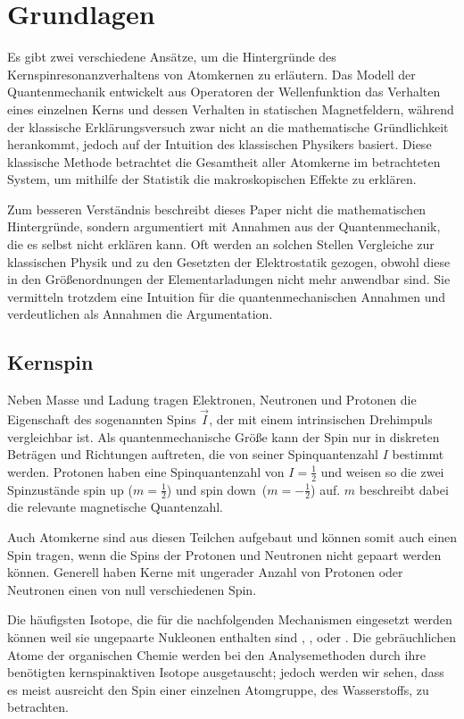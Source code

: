 \section{Grundlagen}
\label{bsc}
Es gibt zwei verschiedene Ansätze, um die Hintergründe des Kernspinresonanzverhaltens von Atomkernen zu erläutern. Das Modell der Quantenmechanik entwickelt aus Operatoren der Wellenfunktion das Verhalten eines einzelnen Kerns und dessen Verhalten in statischen Magnetfeldern, während der klassische Erklärungsversuch zwar nicht an die mathematische Gründlichkeit herankommt, jedoch auf der Intuition des klassischen Physikers basiert. Diese klassische Methode betrachtet die Gesamtheit aller Atomkerne im betrachteten System, um mithilfe der Statistik die makroskopischen Effekte zu erklären.

Zum besseren Verständnis beschreibt dieses Paper nicht die mathematischen Hintergründe, sondern argumentiert mit Annahmen aus der Quantenmechanik, die es selbst nicht erklären kann. Oft werden an solchen Stellen Vergleiche zur klassischen Physik und zu den Gesetzten der Elektrostatik gezogen, obwohl diese in den Grö\ss{}enordnungen der Elementarladungen nicht mehr anwendbar sind. Sie vermitteln trotzdem eine Intuition für die quantenmechanischen Annahmen und verdeutlichen als Annahmen die Argumentation.

\subsection{Kernspin}
\label{bsc:spin}
Neben Masse und Ladung tragen Elektronen, Neutronen und Protonen die Eigenschaft des sogenannten Spins $\vec{I}$, der mit einem intrinsischen Drehimpuls vergleichbar ist. Als quantenmechanische Grö\ss{}e kann der Spin nur in diskreten Beträgen und Richtungen auftreten, die von seiner Spinquantenzahl $I$ bestimmt werden. Protonen haben eine Spinquantenzahl von $ I = \frac{1}{2} $ und weisen so die zwei Spinzustände \glqq{}spin up\grqq{} ($ m=\frac{1}{2} $) und \glqq{}spin down\grqq\ ($m=-\frac{1}{2}$) auf. $m$ beschreibt dabei die relevante magnetische Quantenzahl.~\cite[S. 2]{schlemm08}

Auch Atomkerne sind aus diesen Teilchen aufgebaut und können somit auch einen Spin tragen, wenn die Spins der Protonen und Neutronen nicht gepaart werden können. Generell haben Kerne mit ungerader Anzahl von Protonen oder Neutronen einen von null verschiedenen Spin.

Die häufigsten Isotope, die für die nachfolgenden Mechanismen eingesetzt werden können weil sie ungepaarte Nukleonen enthalten sind , ,  oder . Die gebräuchlichen Atome der organischen Chemie werden bei den Analysemethoden durch ihre benötigten kernspinaktiven Isotope ausgetauscht; jedoch werden wir sehen, dass es meist ausreicht den Spin einer einzelnen Atomgruppe, des Wasserstoffs, zu betrachten.


